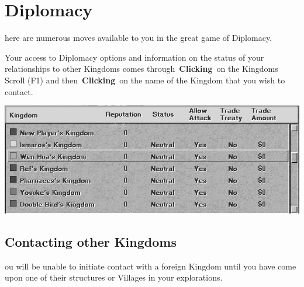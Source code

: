 
\chapter{Diplomacy}

here are numerous moves available to you in the great game of Diplomacy.

Your access to Diplomacy options and information on the status of your relationships to other Kingdoms comes through \textbf{Clicking} on the Kingdoms Scroll (F1) and then \textbf{Clicking} on the name of the Kingdom that you wish to contact.

\begin{center}
	\includegraphics[width=0.9\linewidth]{Idimplomacy}
\end{center}

\section{Contacting other Kingdoms}


ou will be unable to initiate contact with a foreign Kingdom until you have come upon one of their structures or Villages in your explorations.

